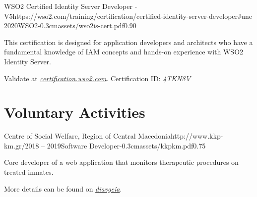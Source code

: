 \documentclass{mycv}
\begin{document}
	\vspace{0.75cm}

	\begin{EntryDatedLogo}{WSO2 Certified Identity Server Developer - V5}{https://wso2.com/training/certification/certified-identity-server-developer}{June 2020}{WSO2}{-0.3cm}{assets/wso2is-cert.pdf}{0.90}
		\begin{Itemize}
			\item This certification is designed for application developers and architects who have a fundamental knowledge of IAM concepts and hands-on experience with WSO2 Identity Server. 
			\item Validate at \href{https://certification.wso2.com}{\textit{certification.wso2.com}}. Certification ID: \textit{4TKN8V}
		\end{Itemize}
	\end{EntryDatedLogo}

	\section{Voluntary Activities}
	\begin{EntryDatedLogo}{Centre of Social Welfare, Region of Central Macedonia}{http://www.kkp-km.gr/}{2018 -- 2019}{Software Developer}{-0.3cm}{assets/kkpkm.pdf}{0.75}
		\begin{Itemize}
			\item Core developer of a web application that monitors therapeutic procedures on treated inmates.
			\item More details can be found on \href{https://diavgeia.gov.gr/decision/view/\%CE\%A8\%CE\%A6\%CE\%A1\%CE\%93\%CE\%9F\%CE\%9E\%CE\%A7\%CE\%A3-\%CE\%A0\%CE\%93\%CE\%A6}{\textit{diavgeia}}.
		\end{Itemize}
	\end{EntryDatedLogo}
\end{document}
